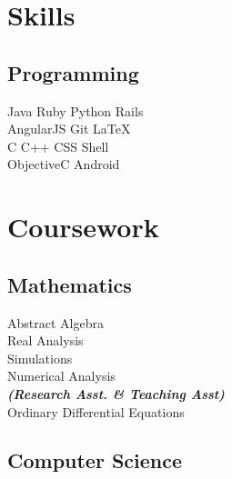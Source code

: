 \documentclass[letterpaper]{deedy-resume} %
\begin{document}
\begin{minipage}[t]{0.33\textwidth}
\sectionspace %


\section{Skills}

\subsection{Programming}

Java \textbullet{} Ruby \textbullet{} Python \textbullet{} Rails \\
AngularJS \textbullet{} Git \textbullet{} \LaTeX\ \\ 
C \textbullet{} C++ \textbullet{} CSS \textbullet{} Shell  \\
ObjectiveC \textbullet{} Android

\sectionspace %


\section{Coursework}

\subsection{Mathematics}

Abstract Algebra \\
Real Analysis \\
Simulations \\
Numerical Analysis \\
{\footnotesize \textit{\textbf{(Research Asst. \& Teaching Asst) }}} \\
Ordinary Differential Equations \\

\sectionspace %


\subsection{Computer Science}


\end{minipage}
\end{document}
